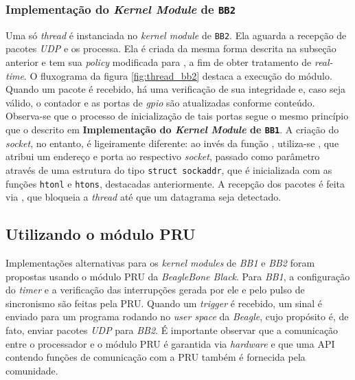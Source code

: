% 

\subsubsection{Implementação do \textit{Kernel Module} de \texttt{BB2}}

Uma só \textit{thread} é instanciada no \textit{kernel module} de \texttt{BB2}.
Ela aguarda a recepção de pacotes \textit{UDP} e os processa. Ela é criada da
mesma forma descrita na subseção anterior e tem sua \textit{policy} modificada
para , a fim de obter tratamento de \textit{real-time}. O
fluxograma da figura \ref{fig:thread_bb2} destaca a execução do módulo. Quando
um pacote é recebido, há uma verificação de sua integridade e, caso seja válido,
o contador e as portas de \textit{gpio} são atualizadas conforme conteúdo.
Observa-se que o processo de inicialização de tais portas segue o mesmo
princípio que o descrito em \textbf{Implementação do \textit{Kernel Module} de
\texttt{BB1}}. A criação do \textit{socket}, no entanto, é ligeiramente
diferente: ao invés da função , utiliza-se , que
atribui um endereço e porta ao respectivo \textit{socket}, passado como
parâmetro através de uma estrutura do tipo \texttt{struct sockaddr}, que é
inicializada com as funções \texttt{htonl} e \texttt{htons}, destacadas
anteriormente. A recepção dos pacotes é feita via , que
bloqueia a \textit{thread} até que um datagrama seja detectado.
% 
% 


\subsection{Utilizando o módulo PRU}

Implementações alternativas para os \textit{kernel modules} de \textit{BB1} e
\textit{BB2} foram propostas usando o módulo PRU da \textit{BeagleBone Black}. 
Para \textit{BB1}, a configuração do \textit{timer} e a verificação das
interrupções gerada por ele e pelo pulso de sincronismo são feitas pela PRU.
Quando um \textit{trigger} é recebido, um sinal é enviado para um programa
rodando no \textit{user space} da \textit{Beagle}, cujo propósito é, de fato, enviar pacotes \textit{UDP} para \textit{BB2}. É
importante observar que a comunicação entre o processador e o módulo PRU é
garantida via \textit{hardware} e que uma API contendo funções de comunicação
com a PRU também é fornecida pela comunidade.

